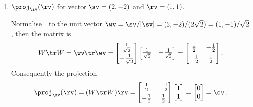 \begin{example}
\begin{enumerate}
\item \(\proj_\sv(\rv)\) for vector \(\sv=(2,-2)\) and \(\rv=(1,1)\).
\begin{solution} 
Normalise~\sv\ to the unit vector \(\wv=\sv/|\sv|=(2,-2)/(2\sqrt2)=(1,-1)/\sqrt2\), then the matrix is
\begin{equation*}
W\tr W=\wv\tr\wv=\begin{bmatrix} \frac1{\sqrt2}\\[1ex] -\frac1{\sqrt2} \end{bmatrix}\begin{bmatrix} \frac1{\sqrt2}&-\frac1{\sqrt2} \end{bmatrix}
=\begin{bmatrix} \frac12&-\frac12\\[1ex]
-\frac12&\frac12 \end{bmatrix}.
\end{equation*}
Consequently the projection
\begin{equation*}
\proj_\sv(\rv)=(W\tr W)\rv
=\begin{bmatrix} \frac12&-\frac12\\[1ex]
-\frac12&\frac12 \end{bmatrix}\begin{bmatrix} 1\\1 \end{bmatrix}
=\begin{bmatrix} 0\\0 \end{bmatrix}=\ov\,.
\end{equation*}
\end{solution}


\end{enumerate}
\end{example}
